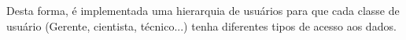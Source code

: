 
Desta forma, é implementada uma hierarquia de usuários para que cada classe de usuário (Gerente, cientista, técnico...) tenha diferentes tipos de acesso aos dados.







